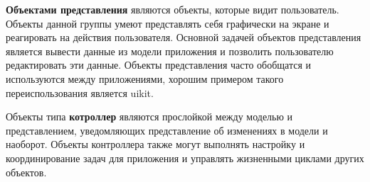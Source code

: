 \textbf{Объектами представления} являются объекты, которые видит пользователь. Объекты данной группы умеют представлять себя графически на экране и реагировать на действия пользователя. Основной задачей объектов представления является вывести данные из модели приложения и позволить пользователю редактировать эти данные. Объекты представления часто обобщатся и используются между приложениями, хорошим примером такого переиспользования является \gls{uikit}. 

Объекты типа \textbf{котроллер} являются прослойкой между моделью и представлением, уведомляющих представление об изменениях в модели и наоборот. Объекты контроллера также могут выполнять настройку и координирование задач для приложения и управлять жизненными циклами других объектов. 